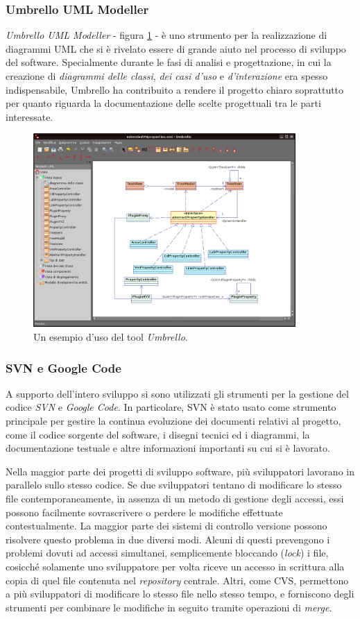 \subsubsection{Umbrello UML Modeller}
\textit{Umbrello UML Modeller} - figura \ref{figura:umbrello_example} - è uno strumento per la realizzazione di diagrammi UML che si è rivelato essere di grande aiuto nel processo di sviluppo del software. Specialmente durante le fasi di analisi e progettazione, in cui la creazione di \textit{diagrammi delle classi}, \textit{dei casi d'uso} e \textit{d'interazione} era spesso indispensabile, Umbrello ha contribuito a rendere il progetto chiaro soprattutto per quanto riguarda la documentazione delle scelte progettuali tra le parti interessate.

\begin{figure}[!htb]
	\centering
	\includegraphics[width=10cm]{images/umbrello.png}
	\caption{Un esempio d'uso del tool \emph{Umbrello}.}
	\label{figura:umbrello_example}
\end{figure}

\subsubsection{SVN e Google Code}
A supporto dell'intero sviluppo si sono utilizzati gli strumenti per la gestione del codice \textit{SVN} e \textit{Google Code}.
In particolare, SVN è stato usato come strumento principale per gestire la continua evoluzione dei documenti relativi al progetto, come il codice sorgente del software, i disegni tecnici ed i diagrammi, la documentazione testuale e altre informazioni importanti su cui si è lavorato.

Nella maggior parte dei progetti di sviluppo software, più sviluppatori lavorano in parallelo sullo stesso codice. Se due sviluppatori tentano di modificare lo stesso file contemporaneamente, in assenza di un metodo di gestione degli accessi, essi possono facilmente sovrascrivere o perdere le modifiche effettuate contestualmente.
La maggior parte dei sistemi di controllo versione possono risolvere questo problema in due diversi modi. Alcuni di questi prevengono i problemi dovuti ad accessi simultanei, semplicemente bloccando (\textit{lock}) i file, cosicché solamente uno sviluppatore per volta riceve un accesso in scrittura alla copia di quel file contenuta nel \textit{repository} centrale. Altri, come CVS, permettono a più sviluppatori di modificare lo stesso file nello stesso tempo, e forniscono degli strumenti per combinare le modifiche in seguito tramite operazioni di \emph{merge}.

